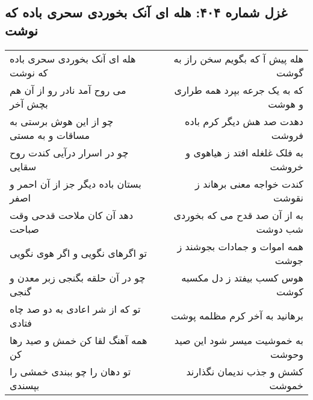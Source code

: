 \begin{center}
\section*{غزل شماره ۴۰۴: هله ای آنک بخوردی سحری باده که نوشت}
\label{sec:0404}
\begin{longtable}{l p{0.5cm} r}
هله ای آنک بخوردی سحری باده که نوشت
&&
هله پیش آ که بگویم سخن راز به گوشت
\\
می روح آمد نادر رو از آن هم بچش آخر
&&
که به یک جرعه بپرد همه طراری و هوشت
\\
چو از این هوش برستی به مساقات و به مستی
&&
دهدت صد هش دیگر کرم باده فروشت
\\
چو در اسرار درآیی کندت روح سقایی
&&
به فلک غلغله افتد ز هیاهوی و خروشت
\\
بستان باده دیگر جز از آن احمر و اصفر
&&
کندت خواجه معنی برهاند ز نقوشت
\\
دهد آن کان ملاحت قدحی وقت صباحت
&&
به از آن صد قدح می که بخوردی شب دوشت
\\
تو اگرهای نگویی و اگر هوی نگویی
&&
همه اموات و جمادات بجوشند ز جوشت
\\
چو در آن حلقه بگنجی زبر معدن و گنجی
&&
هوس کسب بیفتد ز دل مکسبه کوشت
\\
تو که از شر اعادی به دو صد چاه فتادی
&&
برهانید به آخر کرم مظلمه پوشت
\\
همه آهنگ لقا کن خمش و صید رها کن
&&
به خموشیت میسر شود این صید وحوشت
\\
تو دهان را چو ببندی خمشی را بپسندی
&&
کشش و جذب ندیمان نگذارند خموشت
\\
\end{longtable}
\end{center}
